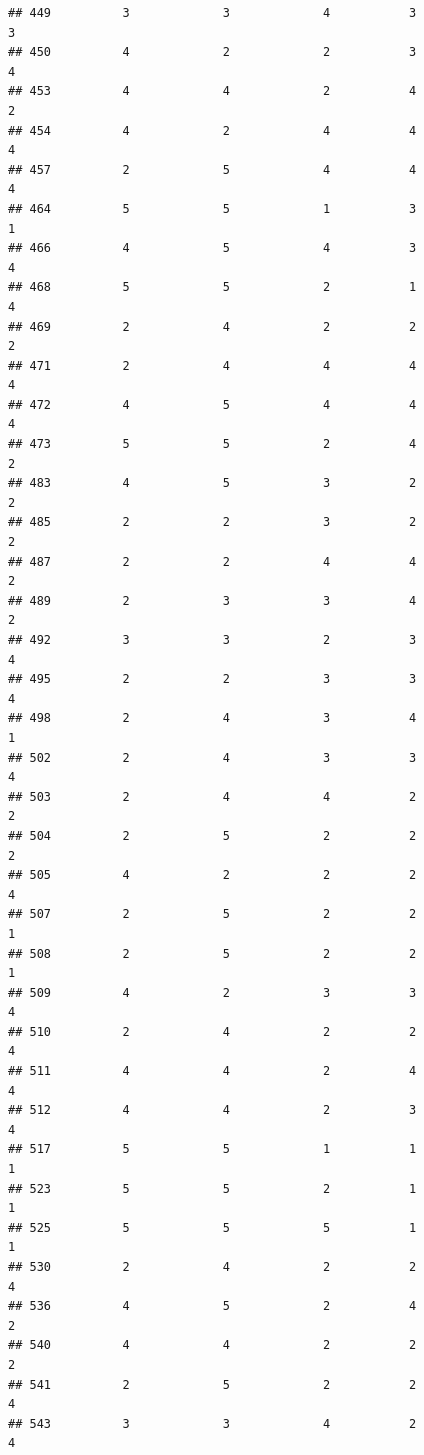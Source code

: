 \documentclass[
]{article}
\begin{document}
\begin{verbatim}
## 449          3             3             4           3             3
## 450          4             2             2           3             4
## 453          4             4             2           4             2
## 454          4             2             4           4             4
## 457          2             5             4           4             4
## 464          5             5             1           3             1
## 466          4             5             4           3             4
## 468          5             5             2           1             4
## 469          2             4             2           2             2
## 471          2             4             4           4             4
## 472          4             5             4           4             4
## 473          5             5             2           4             2
## 483          4             5             3           2             2
## 485          2             2             3           2             2
## 487          2             2             4           4             2
## 489          2             3             3           4             2
## 492          3             3             2           3             4
## 495          2             2             3           3             4
## 498          2             4             3           4             1
## 502          2             4             3           3             4
## 503          2             4             4           2             2
## 504          2             5             2           2             2
## 505          4             2             2           2             4
## 507          2             5             2           2             1
## 508          2             5             2           2             1
## 509          4             2             3           3             4
## 510          2             4             2           2             4
## 511          4             4             2           4             4
## 512          4             4             2           3             4
## 517          5             5             1           1             1
## 523          5             5             2           1             1
## 525          5             5             5           1             1
## 530          2             4             2           2             4
## 536          4             5             2           4             2
## 540          4             4             2           2             2
## 541          2             5             2           2             4
## 543          3             3             4           2             4

\end{verbatim}
\end{document}
